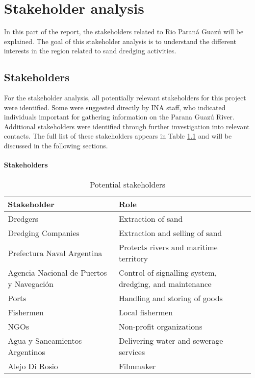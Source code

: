 \chapter{Stakeholder analysis}
\label{chapter:stakeholders}

In this part of the report, the stakeholders related to Rio Paraná Guazú will be explained. The goal of this stakeholder analysis is to understand the different interests in the region related to sand dredging activities.


\section{Stakeholders}

For the stakeholder analysis, all potentially relevant stakeholders for this project were identified. Some were suggested directly by INA staff, who indicated individuals important for gathering information on the Parana Guazú River. Additional stakeholders were identified through further investigation into relevant contacts. The full list of these stakeholders appears in Table \ref{tab:stakeholders} and will be discussed in the following sections.

\subsubsection{Stakeholders}

\begin{table}[ht]
\centering
\begin{tabularx}{\linewidth}{lX}
\toprule
\textbf{Stakeholder} & \textbf{Role} \\
\midrule
Dredgers & Extraction of sand \\
\midrule
Dredging Companies & Extraction and selling of sand \\
\midrule
Prefectura Naval Argentina & Protects rivers and maritime territory \\
\midrule
Agencia Nacional de Puertos y Navegación & Control of signalling system, dredging, and maintenance \\
\midrule
Ports & Handling and storing of goods \\
\midrule
Fishermen & Local fishermen \\
\midrule
NGOs & Non-profit organizations \\
\midrule
Agua y Saneamientos Argentinos & Delivering water and sewerage services \\
\midrule
Alejo Di Rosio & Filmmaker \\
\bottomrule
\end{tabularx}
\caption{Potential stakeholders}
\label{tab:stakeholders}
\end{table}

